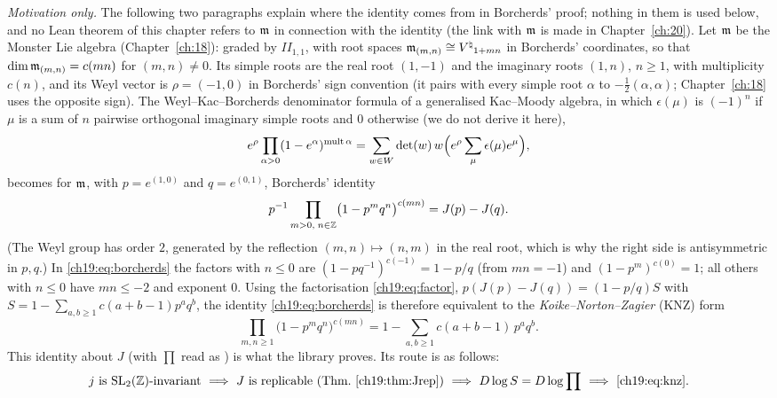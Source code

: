 \emph{Motivation only.}  The following two paragraphs explain where the identity comes from in Borcherds' proof; nothing in
them is used below, and no Lean theorem of this chapter refers to $\mathfrak{m}$ in connection with the identity (the link with
$\mathfrak{m}$ is made in Chapter~\ref{ch:20}).  Let $\mathfrak{m}$ be the Monster Lie algebra (Chapter~\ref{ch:18}): graded by $I\!I_{1,1}$, with root spaces
$\mathfrak{m}_{(m,n)}\cong{V^{\natural}}_{1+mn}$ in Borcherds' coordinates, so that $\dim\mathfrak{m}_{(m,n)}=c(mn)$ for $(m,n)\ne0$.  Its
simple roots are the real root $(1,-1)$ and the imaginary roots $(1,n)$, $n\ge1$, with multiplicity $c(n)$, and its Weyl
vector is $\rho=(-1,0)$ in Borcherds' sign convention (it pairs with every simple root $\alpha$ to $-\frac12(\alpha,\alpha)$; Chapter~\ref{ch:18}
uses the opposite sign).  The Weyl--Kac--Borcherds denominator formula of a generalised Kac--Moody algebra, in which $\epsilon(\mu)$ is
$(-1)^n$ if $\mu$ is a sum of $n$ pairwise orthogonal imaginary simple roots and $0$ otherwise (we do not derive it here),
\begin{equation*}
  e^{\rho}\prod_{\alpha>0}(1-e^{\alpha})^{\operatorname{mult}\alpha}=\sum_{w\in W}\det(w)\,w\Bigl(e^\rho\sum_{\mu}\epsilon(\mu)e^{\mu}\Bigr),
\end{equation*}
becomes for $\mathfrak{m}$, with $p=e^{(1,0)}$ and $q=e^{(0,1)}$, Borcherds' identity
\begin{equation}\label{ch19:eq:borcherds}
  p^{-1}\prod_{m>0,\;n\in{\mathbb{Z}}}\bigl(1-p^mq^n\bigr)^{c(mn)}=J(p)-J(q) .
\end{equation}
(The Weyl group has order $2$, generated by the reflection $(m,n)\mapsto(n,m)$ in the real root, which is why the right
side is antisymmetric in $p,q$.)  In \eqref{ch19:eq:borcherds} the factors with $n\le0$ are $(1-pq^{-1})^{c(-1)}=1-p/q$
(from $mn=-1$) and $(1-p^m)^{c(0)}=1$; all others with $n\le0$ have $mn\le-2$ and exponent $0$.  Using the factorisation
\eqref{ch19:eq:factor}, $p(J(p)-J(q))=(1-p/q)S$ with $S=1-\sum_{a,b\ge1}c(a+b-1)p^aq^b$, the identity
\eqref{ch19:eq:borcherds} is therefore equivalent to the \emph{Koike--Norton--Zagier} (KNZ) form
\begin{equation}\label{ch19:eq:knz}
  \prod_{m,n\ge1}\bigl(1-p^mq^n\bigr)^{c(mn)}=1-\sum_{a,b\ge1}c(a+b-1)\,p^aq^b .\tag{KNZ}
\end{equation}
This identity about $J$ (with $\prod$ read as ) is what the library proves.  Its route is as follows:
\begin{equation*}
  \text{$j$ is $\chnineteenSL$-invariant}\ \Longrightarrow\ \text{$J$ is replicable (Thm.~\ref{ch19:thm:Jrep})}
  \ \Longrightarrow\ D\log S=D\log\prod\ \Longrightarrow\ \eqref{ch19:eq:knz}.
\end{equation*}

